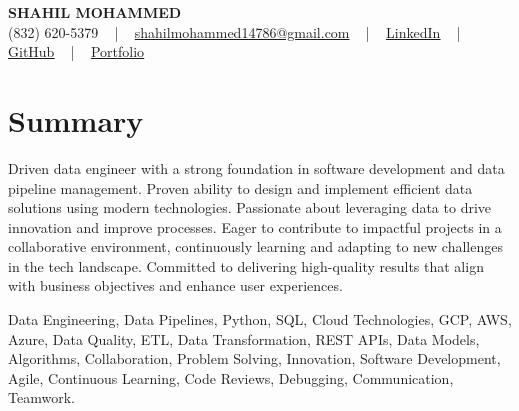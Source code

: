 \documentclass[letterpaper,10pt]{article}
\begin{document}
\begin{center}
    {\fontsize{14pt}{12pt}\selectfont \textbf{\MakeUppercase{Shahil Mohammed}}}\\ \vspace{2pt}
    \fontsize{10pt}{12pt}\selectfont (832) 620-5379 ~ | ~ \href{mailto:shahilmohammed14786@gmail.com}{shahilmohammed14786@gmail.com} ~ | ~  
    \href{https://www.linkedin.com/in/shahil-mohammed-9652931a1/}{\color{blue}\underline{LinkedIn}}  ~ | ~ 
    \href{https://github.com/freakbeast14}{\color{blue}\underline{GitHub}} ~ | ~ 
    \href{https://shahil-mohammed.netlify.app/}{\color{blue}\underline{Portfolio}}
    \vspace{-8pt}
\end{center}

\section{Summary}
\vspace{-2pt}\fontsize{8pt}{9pt}\selectfont
Driven data engineer with a strong foundation in software development and data pipeline management. Proven ability to design and implement efficient data solutions using modern technologies. Passionate about leveraging data to drive innovation and improve processes. Eager to contribute to impactful projects in a collaborative environment, continuously learning and adapting to new challenges in the tech landscape. Committed to delivering high-quality results that align with business objectives and enhance user experiences.
 \vspace{-5pt}
 
{\fontsize{1pt}{1pt}\selectfont\color{white}
Data Engineering, Data Pipelines, Python, SQL, Cloud Technologies, GCP, AWS, Azure, Data Quality, ETL, Data Transformation, REST APIs, Data Models, Algorithms, Collaboration, Problem Solving, Innovation, Software Development, Agile, Continuous Learning, Code Reviews, Debugging, Communication, Teamwork.
}
\vspace{-8pt}

\vspace{-2pt}
\end{document}
